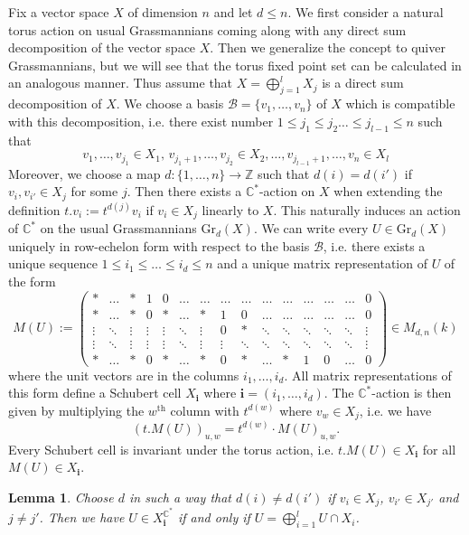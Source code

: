 \documentclass{amsart}
\newtheorem{lemma}[theorem]{Lemma}
\newcommand{\bfi}{\mathbf{i}}
\newcommand{\C}{\mathbb{C}}
\newcommand{\Gr}{\mathrm{Gr}}
\begin{document}
Fix a vector space $X$ of dimension $n$ and let $d\leq n$. We first consider a natural torus action on usual Grassmannians coming along with any direct sum decomposition of the vector space $X$. Then we generalize the concept to quiver Grassmannians, but we will see that the torus fixed point set can be calculated in an analogous manner. Thus assume that $X=\bigoplus_{j=1}^l X_j$ is a direct sum decomposition of $X$. We choose a basis $\mathcal B=\{v_1,\ldots,v_n\}$ of $X$ which is compatible with this decomposition, i.e. there exist number $1\leq j_1\leq j_2\ldots\leq j_{l-1}\leq n$ such that
\[v_1,\ldots,v_{j_1}\in X_1,\,v_{j_1+1},\ldots,v_{j_2}\in X_2,\ldots,v_{j_{l-1}+1},\ldots,v_{n}\in X_l\]
Moreover, we choose a map $d:\{1,\ldots,n\}\to\mathbb{Z}$ such that $d(i)=d(i')$ if $v_i,v_{i'}\in X_{j}$ for some $j$. Then there exists a $\C^\ast$-action on $X$ when extending the definition $t.v_i:=t^{d(j)}v_i$ if $v_i\in X_j$ linearly to $X$. This naturally induces an action of $\C^\ast$ on the usual Grassmannians $\Gr_d(X)$. We can write every $U\in\Gr_d(X)$ uniquely in row-echelon form with respect to the basis $\mathcal B$, i.e. there exists a unique sequence $1\leq i_1\leq\ldots\leq i_d\leq n$ and a unique matrix representation of $U$ of the form
\[M(U):=\begin{pmatrix}\ast&\ldots &\ast &1&0 &\ldots&\ldots&\ldots&\ldots&\ldots&\ldots&\ldots&\ldots&\ldots&0\\\ast&\ldots &\ast&0&\ast&\ldots &\ast&1&0&\ldots&\ldots&\ldots&\ldots&\ldots&0\\\vdots &\ddots&\vdots&\vdots&\vdots &\ddots&\vdots&0&\ast&\ddots&\ddots&\ddots&\ddots&\ddots&\vdots\\\vdots &\ddots&\vdots&\vdots&\vdots &\ddots&\vdots&\vdots&\ddots&\ddots&\ddots&\ddots&\ddots&\ddots&\vdots\\\ast&\ldots &\ast&0&\ast&\ldots &\ast&0&\ast&\ldots&\ast&1&0&\ldots&0\end{pmatrix}\in M_{d,n}(k)\]
where the unit vectors are in the columns $i_1,\ldots,i_d$. All matrix representations of this form define a Schubert cell $X_{\bfi}$ where $\bfi=(i_1,\ldots,i_d)$. The $\C^\ast$-action is then given by multiplying the $w^{\mathrm{th}}$ column with $t^{d(w)}$ where $v_w\in X_j$, i.e. we have
\[(t.M(U))_{u,w}=t^{d(w)}\cdot M(U)_{u,w}.\]
Every Schubert cell is invariant under the torus action, i.e. $t.M(U)\in X_\bfi$ for all $M(U)\in X_{\bfi}$. 
\begin{lemma}\label{usualGrass}
Choose $d$ in such a way that $d(i)\neq d(i')$ if $v_i\in X_j$, $v_{i'}\in X_{j'}$ and $j\neq j'$.
Then we have $U\in X_{\bfi}^{\C^\ast}$ if and only if $U=\bigoplus_{i=1}^l U\cap X_i$.
\end{lemma}
\end{document}
